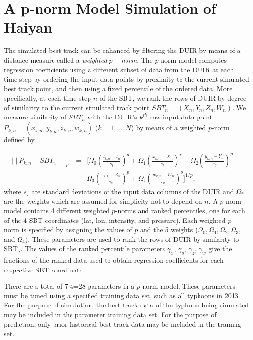 \documentclass{SBCbookchapter}
\begin{document}
 \section{A p-norm Model Simulation of Haiyan}
 The simulated best track can be enhanced by filtering the DUIR by means of  a distance measure called a \emph{weighted $p-$norm}.
The $p$-norm model computes regression coefficients using a different subset of data from the DUIR at each time step by ordering the input data points by proximity to the current simulated best track point, and then using a fixed percentile of the ordered data. More specifically, at each time step $n$ of the SBT, we rank the rows of DUIR by degree of similarity to the current simulated track point $SBT_{n}=(X_{n},Y_{n},Z_{n}, W_n)$. We measure similarity of $SBT_n$ with the DUIR's $k^{th}$ row input data point  $ P_{k,n}=(x_{k,n}, y_{k,n},z_{k,n},w_{k,n})$ ($k=1,...,N$) by means of a weighted $p$-norm   defined by

          \begin{eqnarray*}
  \mid\mid P_{k,n} - SBT_n \mid\mid_{p} & = & \Big[\Omega_0 (\frac{t_{k,n}-t_n}{s_t})^p + \Omega_1(\frac{x_{k,n}-X_n}{s_x})^p + \Omega_2(\frac{y_{k,n}-Y_n}{s_y})^p+ \\
  && \Omega_3 (\frac{z_{k,n}-Z_n}{s_z})^p +  \Omega_4(\frac{w_{k,n}-W_n}{s_w})^p \Big]^{1/p},
  \label{pnorm}
        \end{eqnarray*}
        {\flushleft where}  $s_{_*}$ are standard deviations of the input data columns of the DUIR and $\Omega_*$ are the weights which are assumed for simplicity not to  depend on $n$. A $p$-norm model contains 4 different weighted $p$-norms and ranked percentiles, one for each of the 4 SBT coordinates (lat, lon, intensity, and pressure). Each weighted $p$-norm is specified by assigning the values of $p$ and the 5 weights ($\Omega_0,\Omega_1,\Omega_2,\Omega_3$, and $\Omega_4$). These parameters are used to rank the rows of DUIR by similarity to SBT$_n$. The values of  the ranked percentile parameters $\gamma_x$, $\gamma_y$, $\gamma_z$, $\gamma_w$ give the fractions of the ranked data used to obtain regression coefficients for each respective SBT coordinate.

        There are a total of 7$\cdot$4=28  parameters in a $p$-norm model.
        These parameters must be tuned using a specified training data set, such as all typhoons in 2013.  For the purpose of simulation, the best track data of the typhoon being simulated may be included in the parameter training data set.  For the purpose of prediction, only prior historical best-track data may be included in the training set.
\end{document}
